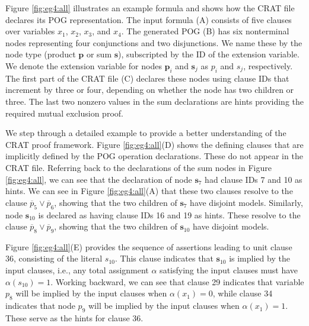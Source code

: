 \documentclass[letterpaper,USenglish,cleveref, autoref, thm-restate]{lipics-v2021}
\newcommand{\obar}[1]{\overline{#1}}
\newcommand{\assign}{\alpha}
\newcommand{\makenode}[1]{\mathbf{#1}}
\newcommand{\nodes}{\makenode{s}}
\newcommand{\nodep}{\makenode{p}}
\begin{document}
Figure \ref{fig:eg4:all} illustrates an example formula and shows how
the CRAT file declares its POG representation.  The input formula (A)
consists of five clauses over variables $x_1$, $x_2$, $x_3$, and
$x_4$.  The generated POG (B) has six nonterminal nodes representing
four conjunctions and two disjunctions.  We name these by the node
type (product $\nodep$ or sum $\nodes$), subscripted by the ID of the
extension variable.  We denote the extension variable for nodes $\nodep_i$ and $\nodes_j$ as $p_i$ and $s_j$, respectively.
  The first part of the CRAT file (C) declares
these nodes using clause IDs that increment by three or four,
depending on whether the node has two children or three.  The last two
nonzero values in the sum declarations are hints providing the
required mutual exclusion proof.

We step through a detailed example to provide a better understanding of the CRAT proof framework.
Figure
\ref{fig:eg4:all}(D) shows the defining clauses that are implicitly
defined by the POG operation declarations.  These do not appear in the
CRAT file.  Referring back to the declarations of the sum nodes in
Figure \ref{fig:eg4:all}, we can see that the declaration of node
$\nodes_7$ had clause IDs 7 and 10 as hints.  We can see in Figure
\ref{fig:eg4:all}(A) that these two clauses resolve to the clause
$\obar{p}_5 \lor \obar{p}_6$, showing that the two children of $\nodes_7$
have disjoint models.  Similarly, node $\nodes_{10}$ is declared as having
clause IDs 16 and 19 as hints.  These resolve to the clause
$\obar{p}_8 \lor \obar{p}_9$, showing that the two children of
$\nodes_{10}$ have disjoint models.

Figure \ref{fig:eg4:all}(E) provides the sequence of assertions
leading to unit clause 36, consisting of the literal $s_{10}$.  This clause indicates that $\nodes_{10}$ is implied by the input clauses, i.e.,
any total assignment $\assign$
satisfying the input clauses must have $\assign(s_{10}) = 1$.
Working backward, we can see that
clause 29 indicates that variable $p_8$ will be implied by the input
clauses when $\assign(x_1) = 0$, while clause 34 indicates that node $p_9$ will
be implied by the input clauses when $\assign(x_1) = 1$.  These serve as the
hints for clause 36.
\end{document}
